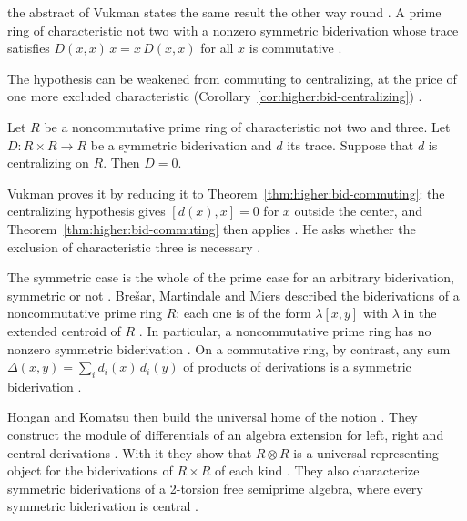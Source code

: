 the abstract of Vukman states the same result the other way round
\cite[p.~245]{Vukman1989Bid}. A prime ring of characteristic not two with a
nonzero symmetric biderivation whose trace satisfies $D(x,x)\,x=x\,D(x,x)$
for all $x$ is commutative \cite[p.~245]{Vukman1989Bid}.

The hypothesis can be weakened from commuting to centralizing, at the price
of one more excluded characteristic (Corollary~\ref{cor:higher:bid-centralizing}) \cite[p.~249]{Vukman1989Bid}.

\begin{corollary}\label{cor:higher:bid-centralizing}
Let $R$ be a noncommutative prime ring of characteristic not two and three.
Let $D\colon R\times R\to R$ be a symmetric biderivation and $d$ its trace.
Suppose that $d$ is centralizing on $R$. Then $D=0$.
\end{corollary}

Vukman proves it by reducing it to Theorem~\ref{thm:higher:bid-commuting}:
the centralizing hypothesis gives $[d(x),x]=0$ for $x$ outside the center,
and Theorem~\ref{thm:higher:bid-commuting} then applies
\cite[p.~250]{Vukman1989Bid}. He asks whether the exclusion of
characteristic three is necessary \cite[p.~250]{Vukman1989Bid}.

The symmetric case is the whole of the prime case for an arbitrary
biderivation, symmetric or not \cite[p.~669]{HonganKomatsu2000}. Brešar,
Martindale and Miers described the biderivations of a noncommutative prime
ring $R$: each one is of the form $\lambda[x,y]$ with $\lambda$ in the
extended centroid of $R$ \cite[reference~1]{BresarMartindaleMiers1993}. In
particular, a noncommutative prime ring has no nonzero symmetric biderivation
\cite[p.~669]{HonganKomatsu2000}. On a commutative ring, by contrast, any
sum $\Delta(x,y)=\sum_{i} d_i(x)\,d_i(y)$ of products of derivations is a
symmetric biderivation \cite[p.~669]{HonganKomatsu2000}.

Hongan and Komatsu then build the universal home of the notion
\cite[p.~670]{HonganKomatsu2000}. They construct the module of
differentials of an algebra extension for left, right and central
derivations \cite[p.~670]{HonganKomatsu2000}. With it they show that
$R\otimes R$ is a universal representing object for the biderivations of
$R\times R$ of each kind \cite[p.~671]{HonganKomatsu2000}. They also
characterize symmetric biderivations of a 2-torsion free semiprime algebra,
where every symmetric biderivation is central \cite[p.~671]{HonganKomatsu2000}.

